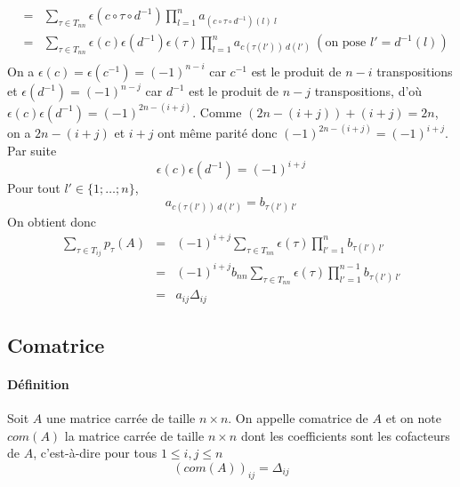 {\begin{eqnarray*}
      &=& \sum_{\tau \in T_{n n}} \epsilon(c \circ \tau \circ d^{-1}) \prod_{l=1}^{n} a_{(c \circ \tau \circ d^{-1})(l) ~ l} \\
      &=& \sum_{\tau \in T_{n n}} \epsilon(c) \epsilon(d^{-1}) \epsilon(\tau) \prod_{l=1}^{n} a_{c(\tau(l')) ~ d(l')} ~ (\text{on pose } l' = d^{-1}(l))\\
  \end{eqnarray*}
  On a $\epsilon(c) = \epsilon(c^{-1}) = (-1)^{n-i}$ car $c^{-1}$ est le produit de $n-i$ transpositions et $\epsilon(d^{-1}) = (-1)^{n-j}$ car $d^{-1}$ est le produit de $n-j$ transpositions, d'où $\epsilon(c) \epsilon(d^{-1}) = (-1)^{2n - (i+j)}$. Comme $(2n - (i+j)) + (i+j) = 2n$, on a $2n - (i+j)$ et $i+j$ ont même parité donc $(-1)^{2n - (i+j)} = (-1)^{i+j}$. Par suite
  $$\epsilon(c) \epsilon(d^{-1}) = (-1)^{i+j}$$
  Pour tout $l' \in \{1; \ldots; n \}$, 
  $$a_{c(\tau(l')) ~ d(l')} = b_{\tau(l') ~ l'}$$
  On obtient donc
  \begin{eqnarray*}
    \sum_{\tau \in T_{ij}} p_{\tau}(A) &=& (-1)^{i+j} \sum_{\tau \in T_{nn}} \epsilon(\tau) \prod_{l'=1}^{n} b_{\tau(l') ~ l'} \\
      &=& (-1)^{i+j} b_{nn} \sum_{\tau \in T_{nn}} \epsilon(\tau) \prod_{l' = 1}^{n-1} b_{\tau(l') ~ l'} \\
      &=& a_{ij} \Delta_{ij}
  \end{eqnarray*}
}

%
\subsection{Comatrice}
%
\paragraph{Définition} Soit $A$ une matrice carrée de taille $n \times n$. On appelle comatrice de $A$ et on note $com(A)$ la matrice carrée de taille $n \times n$ dont les coefficients sont les cofacteurs de $A$, c'est-à-dire pour tous $1 \leq i, j \leq n$
$$(com(A))_{ij} = \Delta_{ij}$$

